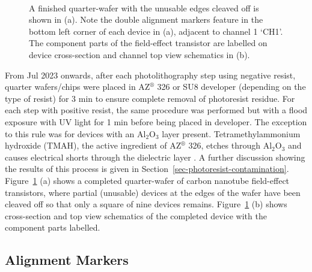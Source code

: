 \documentclass[
  a4paper,
]{scrbook}
\begin{document}
\begin{figure}
\begin{minipage}[t]{0.45\linewidth}
{{}

}

\end{minipage}%
%
\begin{minipage}[t]{0.01\linewidth}

{\centering 

~

}

\end{minipage}%

\caption{\label{fig-field-effect-transistor}A finished quarter-wafer
with the unusable edges cleaved off is shown in (a). Note the double
alignment markers feature in the bottom left corner of each device in
(a), adjacent to channel 1 `CH1'. The component parts of the
field-effect transistor are labelled on device cross-section and channel
top view schematics in (b).}

\end{figure}

From Jul 2023 onwards, after each photolithography step using negative
resist, quarter wafers/chips were placed in AZ\(^\circledR\) 326 or SU8
developer (depending on the type of resist) for 3 min to ensure complete
removal of photoresist residue. For each step with positive resist, the
same procedure was performed but with a flood exposure with UV light for
1 min before being placed in developer. The exception to this rule was
for devices with an Al\(_2\)O\(_3\) layer present. Tetramethylammonium
hydroxide (TMAH), the active ingredient of AZ\(^\circledR\) 326, etches
through Al\(_2\)O\(_3\) and causes electrical shorts through the
dielectric layer \autocite{Oh2011,Ali2021}. A further discussion showing
the results of this process is given in
Section~\ref{sec-photoresist-contamination}.
Figure~\ref{fig-field-effect-transistor} (a) shows a completed
quarter-wafer of carbon nanotube field-effect transistors, where partial
(unusable) devices at the edges of the wafer have been cleaved off so
that only a square of nine devices remains.
Figure~\ref{fig-field-effect-transistor} (b) shows cross-section and top
view schematics of the completed device with the component parts
labelled.

\hypertarget{sec-align}{%
\subsection{Alignment Markers}\label{sec-align}}
\end{document}
